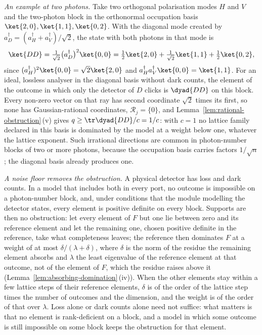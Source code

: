 \begin{remark}
\emph{An example at two photons.} Take two orthogonal polarisation modes $H$
and $V$ and the two-photon block in the orthonormal occupation basis
$\ket{2,0},\ket{1,1},\ket{0,2}$. With the diagonal mode created by
$a_D^{\dagger}=(a_H^{\dagger}+a_V^{\dagger})/\sqrt2$, the state with both
photons in that mode is
\begin{equation*}
  \ket{DD}=\tfrac{1}{\sqrt2}\big(a_D^{\dagger}\big)^{2}\ket{0,0}
  =\tfrac12\ket{2,0}+\tfrac{1}{\sqrt2}\ket{1,1}+\tfrac12\ket{0,2},
\end{equation*}
since $(a_H^{\dagger})^{2}\ket{0,0}=\sqrt2\ket{2,0}$ and
$a_H^{\dagger}a_V^{\dagger}\ket{0,0}=\ket{1,1}$. For an ideal, lossless
analyser in the diagonal basis without dark counts, the element of the
outcome in which only the detector of $D$ clicks is $\dyad{DD}$ on this block.
Every non-zero vector on that ray has second coordinate $\sqrt2$ times its
first, so none has Gaussian-rational coordinates, $\mathcal{R}_j=\{0\}$, and
Lemma~\ref{lem:rational-obstruction}\,(v) gives $q\ge\tr\dyad{DD}/c=1/c$:
with $c=1$ no lattice family declared in this basis is dominated by the
model at a weight below one, whatever the lattice exponent. Such irrational
directions are common in photon-number blocks of two or more photons,
because the occupation basis carries factors $1/\sqrt{n}$; the diagonal basis
already produces one.

\emph{A noise floor removes the obstruction.} A physical detector has loss and
dark counts. In a model that includes both in every port, no outcome is
impossible on a photon-number block, and, under conditions that the module
modelling the detector states, every element is positive definite on every
block. Supports are then no obstruction: let every element of $F$ but one
lie between zero and its reference element and let the remaining one, chosen
positive definite in the reference, take what completeness leaves; the
reference then dominates $F$ at a weight of at most $\delta/(\lambda+\delta)$,
where $\delta$ is the norm of the residue the remaining element absorbs and
$\lambda$ the least eigenvalue of the reference element at that outcome, not
of the element of $F$, which the residue raises above it
(Lemma~\ref{lem:absorbing-domination}\,(iv)).
When the other elements stay within a few lattice steps of their reference
elements, $\delta$ is of the order of the lattice step times the number of
outcomes and the dimension, and the weight is of the order of that over
$\lambda$. Loss alone or dark counts alone need not suffice: what matters is
that no element is rank-deficient on a block, and a model in which some
outcome is still impossible on some block keeps the obstruction for that
element.


\end{remark}
